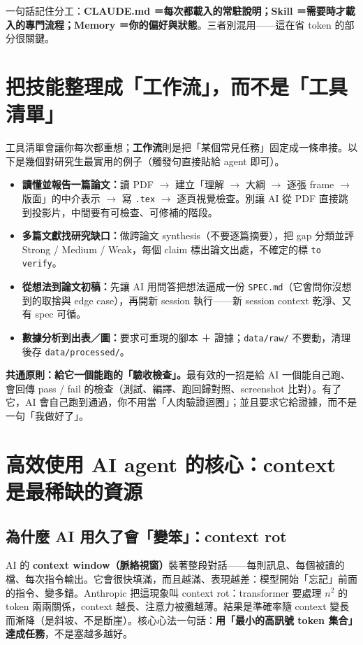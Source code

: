 \documentclass[12pt, a4paper]{article}
\begin{document}
一句話記住分工：\textbf{CLAUDE.md ＝每次都載入的常駐說明；Skill ＝需要時才載入的專門流程；Memory ＝你的偏好與狀態}。三者別混用——這在省 token 的部分很關鍵。

\section{把技能整理成「工作流」，而不是「工具清單」}

工具清單會讓你每次都重想；\textbf{工作流}則是把「某個常見任務」固定成一條串接。以下是幾個對研究生最實用的例子（觸發句直接貼給 agent 即可）。

\begin{itemize}
  \item \textbf{讀懂並報告一篇論文：}讀 PDF $\rightarrow$ 建立「理解 $\rightarrow$ 大綱 $\rightarrow$ 逐張 frame $\rightarrow$ 版面」的中介表示 $\rightarrow$ 寫 \texttt{.tex} $\rightarrow$ 逐頁視覺檢查。別讓 AI 從 PDF 直接跳到投影片，中間要有可檢查、可修補的階段。
  \item \textbf{多篇文獻找研究缺口：}做跨論文 synthesis（不要逐篇摘要），把 gap 分類並評 Strong / Medium / Weak，每個 claim 標出論文出處，不確定的標 \texttt{to verify}。
  \item \textbf{從想法到論文初稿：}先讓 AI 用問答把想法逼成一份 \texttt{SPEC.md}（它會問你沒想到的取捨與 edge case），再開新 session 執行——新 session context 乾淨、又有 spec 可循。
  \item \textbf{數據分析到出表／圖：}要求可重現的腳本 ＋ 證據；\texttt{data/raw/} 不要動，清理後存 \texttt{data/processed/}。
\end{itemize}

\textbf{共通原則：給它一個能跑的「驗收檢查」。}最有效的一招是給 AI 一個能自己跑、會回傳 pass / fail 的檢查（測試、編譯、跑回歸對照、screenshot 比對）。有了它，AI 會自己跑到通過，你不用當「人肉驗證迴圈」；並且要求它給證據，而不是一句「我做好了」。

\section{高效使用 AI agent 的核心：context 是最稀缺的資源}

\subsection{為什麼 AI 用久了會「變笨」：context rot}

AI 的 \textbf{context window（脈絡視窗）}裝著整段對話——每則訊息、每個被讀的檔、每次指令輸出。它會很快填滿，而且越滿、表現越差：模型開始「忘記」前面的指令、變多錯。Anthropic 把這現象叫 context rot：transformer 要處理 $n^2$ 的 token 兩兩關係，context 越長、注意力被攤越薄。結果是準確率隨 context 變長而漸降（是斜坡、不是斷崖）。核心心法一句話：\textbf{用「最小的高訊號 token 集合」達成任務}，不是塞越多越好。
\end{document}
